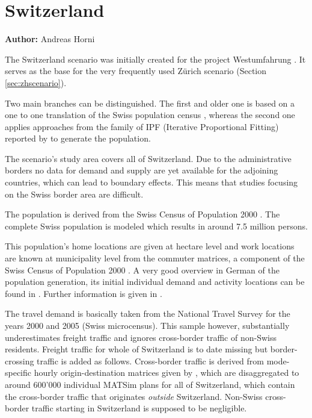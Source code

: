 \section{Switzerland}
\hfill \textbf{Author:} Andreas Horni

The Switzerland scenario was initially created for the project Westumfahrung \citep[][]{BalmerEtAl_ResRep_bdktzrh_2009}. It serves as the base for the very frequently used Zürich scenario (Section \ref{sec:zhscenario}). 

Two main branches can be distinguished. The first and older one is based on a one to one translation of the Swiss population census \citep[][]{BfS_VZ_2000}, whereas the second one applies approaches from the family of IPF (Iterative Proportional Fitting) reported by \citet[][]{MuellerKAxhausen_TechRep_IVT_2013, Mueller_unpub_LATSIS_2012, Mueller_unpub_ETC_2011, Mueller_unpub_STRC_2011, Mueller_unpub_IATBR_2012} to generate the population.

The scenario's study area covers all of Switzerland. Due to the administrative borders no data for demand and supply are yet available for the adjoining countries, which can lead to boundary effects. This means that studies focusing on the Swiss border area are difficult.

The population is derived from the Swiss Census of Population 2000 \citep[][]{BfS_VZ_2000}. The complete Swiss population is modeled which results in around 7.5 million persons. 

This population's home locations are given at hectare level and work locations are known at municipality level from the commuter matrices, a component of the Swiss Census of Population 2000 \citep[][p.35]{BalmerEtAl_ResRep_bdktzrh_2009}. A very good overview in German of the population generation, its initial individual demand and activity locations can be found in \citet{MeisterEtAl_SVT_2009}. Further information is given in \citet[][]{CiariEtAl_STRC_2008, MeisterEtAl_WCTRS_2010, BalmerEtAl_ResRep_bdktzrh_2009, BalmerEtAl_ResRep_datapuls_2010, BalmerEtAl_HEUREKA_2008}.

The travel demand is basically taken from the National Travel Survey for the years 2000 and 2005 \citep[][]{BfS-MZ2005_manual_2006} (Swiss microcensus). This sample however, substantially underestimates freight traffic and ignores cross-border traffic of non-Swiss residents. Freight traffic for whole of Switzerland is to date missing but border-crossing traffic is added as follows. Cross-border traffic is derived from mode-specific hourly origin-destination matrices given by \citet[][]{VrticEtAl_ResRep_UVEK_2007}, which are disaggregated to around 600'000 individual MATSim plans for all of Switzerland, which contain the cross-border traffic that originates \emph{outside} Switzerland. Non-Swiss cross-border traffic starting in Switzerland is supposed to be negligible. 

